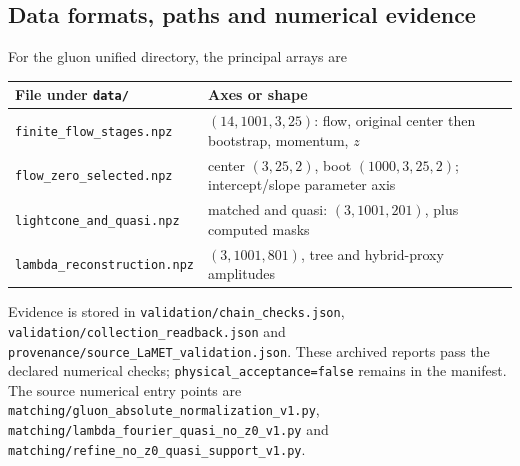 \documentclass[11pt]{article}
\numberwithin{equation}{section}
\begin{document}
\subsection{Data formats, paths and numerical evidence}

For the gluon unified directory, the principal arrays are
\begin{center}
\begin{tabular}{p{}p{}}
\toprule
File under \texttt{data/} & Axes or shape\\
\midrule
\nolinkurl{finite_flow_stages.npz} &
\((14,1001,3,25)\): flow, original center then bootstrap, momentum, \(z\)\\
\nolinkurl{flow_zero_selected.npz} &
center \((3,25,2)\), boot \((1000,3,25,2)\); intercept/slope parameter axis\\
\nolinkurl{lightcone_and_quasi.npz} &
matched and quasi: \((3,1001,201)\), plus computed masks\\
\nolinkurl{lambda_reconstruction.npz} &
\((3,1001,801)\), tree and hybrid-proxy amplitudes\\
\bottomrule
\end{tabular}
\end{center}
Evidence is stored in
\nolinkurl{validation/chain_checks.json},
\nolinkurl{validation/collection_readback.json} and
\nolinkurl{provenance/source_LaMET_validation.json}.
These archived reports pass the declared numerical checks;
\texttt{physical\_acceptance=false} remains in the manifest.
The source numerical entry points are
\nolinkurl{matching/gluon_absolute_normalization_v1.py},
\nolinkurl{matching/lambda_fourier_quasi_no_z0_v1.py} and
\nolinkurl{matching/refine_no_z0_quasi_support_v1.py}.
\end{document}
